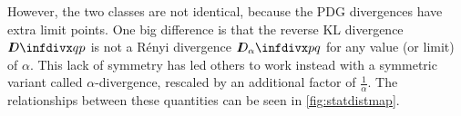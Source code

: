 \documentclass[twoside]{article}
\theoremstyle{plain}
\theoremstyle{definition}
\newcommand{\thickD}{I\mkern-8muD}
\newcommand{\kldiv}{\thickD\infdivx}
\newcommand{\V}{\mathcal V}
\begin{document}
However, the two classes are not identical, because the PDG divergences have extra limit points.
One big difference is that the reverse KL divergence $\kldiv q p$ is not a R\'enyi divergence $\thickD_\alpha\infdivx p q$ for any value (or limit) of $\alpha$.
This lack of symmetry has led others \parencite[e.g.,][]{cichocki2010families}
to work instead with a symmetric variant called $\alpha$-divergence, rescaled by an additional factor of $\frac1\alpha$.
The relationships between these quantities can be seen in \cref{fig:statdistmap}.

%
\end{document}
